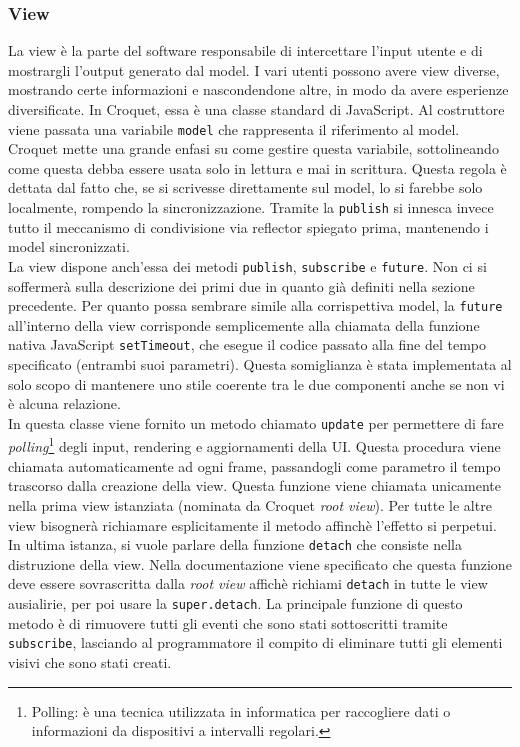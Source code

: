 \subsubsection{View}\label{subsubsec:Croquet_view}
La view è la parte del software responsabile di intercettare l'input utente e di mostrargli l'output generato dal model. I vari utenti possono avere view 
diverse, mostrando certe informazioni e nascondendone altre, in modo da avere esperienze diversificate. In Croquet, essa è una classe standard di JavaScript.
Al costruttore viene passata una variabile \texttt{model} che rappresenta il riferimento al model. Croquet mette una grande enfasi su come gestire questa variabile, 
sottolineando come questa debba essere usata solo in lettura e mai in scrittura. Questa regola è dettata dal fatto che, se si scrivesse direttamente sul model, lo si farebbe solo 
localmente, rompendo la sincronizzazione. Tramite la \texttt{publish} si innesca invece tutto il meccanismo di condivisione via reflector spiegato prima, mantenendo i model
sincronizzati.\\
\newline
La view dispone anch'essa dei metodi \texttt{publish}, \texttt{subscribe} e \texttt{future}. Non ci si soffermerà sulla descrizione dei primi due in quanto già definiti
nella sezione precedente. Per quanto possa sembrare simile alla corrispettiva model, la \texttt{future} all'interno della view corrisponde semplicemente alla chiamata della 
funzione nativa JavaScript \texttt{setTimeout}, che esegue il codice passato alla fine del tempo specificato (entrambi suoi parametri). Questa somiglianza è stata implementata al 
solo scopo di mantenere uno stile coerente tra le due componenti anche se non vi è alcuna relazione.\\
\newline
In questa classe viene fornito un metodo chiamato \texttt{update} per permettere di fare \textit{polling}\footnote{
    Polling: è una tecnica utilizzata in informatica per raccogliere dati o informazioni da dispositivi a intervalli regolari.

} degli input, rendering e aggiornamenti della UI. Questa procedura viene chiamata
automaticamente ad ogni frame, passandogli come parametro il tempo trascorso dalla creazione della view. Questa funzione viene chiamata unicamente nella prima
view istanziata (nominata da Croquet \textit{root view}). Per tutte le altre view bisognerà richiamare esplicitamente il metodo affinchè l'effetto si perpetui.\\
\newline
In ultima istanza, si vuole parlare della funzione \texttt{detach} che consiste nella distruzione della view. Nella documentazione viene specificato che questa funzione deve essere
sovrascritta dalla \textit{root view} affichè richiami \texttt{detach} in tutte le view ausialirie, per poi usare la \texttt{super.detach}. La principale funzione di questo metodo
è di rimuovere tutti gli eventi che sono stati sottoscritti tramite \texttt{subscribe}, lasciando al programmatore il compito di eliminare tutti gli elementi visivi che sono stati
creati.\\
